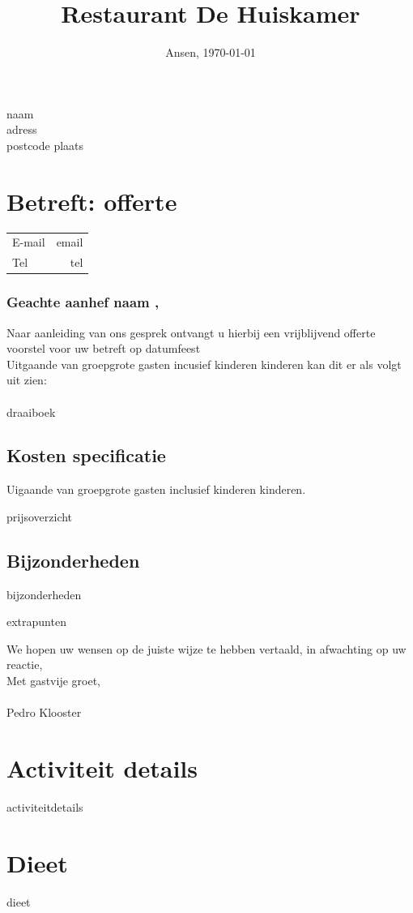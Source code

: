 \documentclass{scrartcl}
\begin{document}

\title{Restaurant De Huiskamer}
\date{Ansen, \today}
\maketitle
\thispagestyle{empty}

\begin{flushright}
	{{ naam }} \\
	{{ adress }} \\
	{{ postcode }} {{ plaats }}
\end{flushright}
\section{Betreft: offerte}
\begin{tabular}{l r}
  E-mail & {{ email }}  \\
  Tel & {{ tel }}  \\
\end{tabular}

\subsubsection*{Geachte {{ aanhef }} {{ naam }},}

Naar aanleiding van ons gesprek ontvangt u hierbij een vrijblijvend offerte voorstel
voor uw {{ betreft }} op {{ datumfeest }} \\

Uitgaande van {{ groepgrote }} gasten incusief {{ kinderen }} kinderen kan dit er als volgt uit zien: \\\\
{{ draaiboek }}

\newpage

\subsection*{Kosten specificatie}
Uigaande van {{ groepgrote }} gasten inclusief {{ kinderen }} kinderen.

{{ prijsoverzicht }}

\subsection*{Bijzonderheden}

{{ bijzonderheden }}

{{ extrapunten }}

We hopen uw wensen op de juiste wijze te hebben vertaald, in afwachting op uw reactie, \\

Met gastvije groet, \\\\

Pedro Klooster

\newpage

\section{Activiteit details}

{{ activiteitdetails }}

\section{Dieet}

{{ dieet }}
\end{document}
